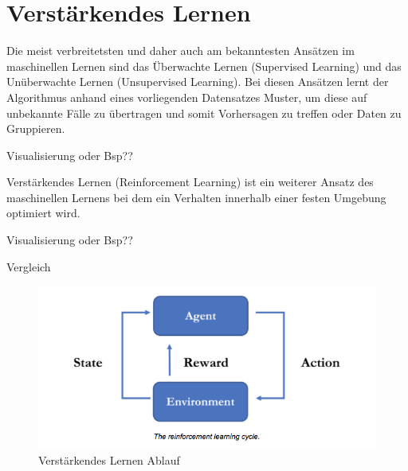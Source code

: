 {\chapter{Verstärkendes Lernen}}
\label{sec:rl}
Die meist verbreitetsten und daher auch am bekanntesten Ansätzen im maschinellen Lernen sind das Überwachte Lernen (Supervised Learning) und das Unüberwachte Lernen (Unsupervised Learning). Bei diesen Ansätzen lernt der Algorithmus anhand eines vorliegenden Datensatzes Muster, um diese auf unbekannte Fälle zu übertragen und somit Vorhersagen zu treffen oder Daten zu Gruppieren.

Visualisierung oder Bsp??

Verstärkendes Lernen (Reinforcement Learning) ist ein weiterer Ansatz des maschinellen Lernens bei dem ein Verhalten innerhalb einer festen Umgebung optimiert wird. 

Visualisierung oder Bsp??

Vergleich

\begin{figure}[htb]
  \centering  
  \includegraphics[scale=0.5]{img/rl_cycle.png}
  \caption{Verstärkendes Lernen Ablauf \protect\cite{unity_mlagents_rl_cycle}}
  \label{fig:rl_cycle}
\end{figure}